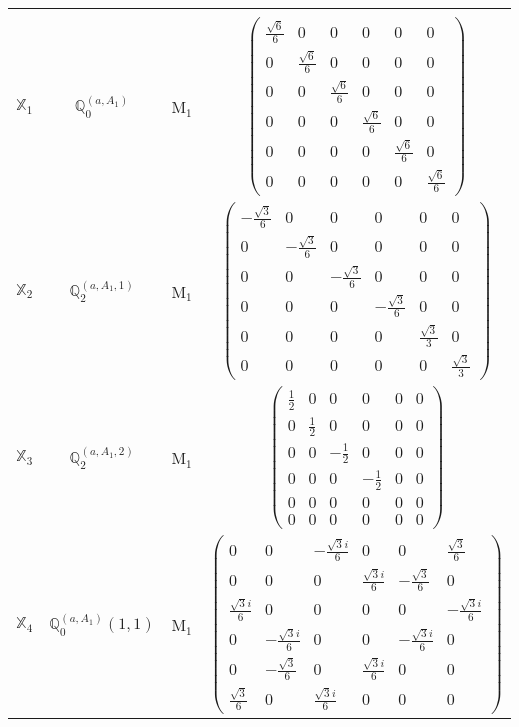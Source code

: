 \documentclass[fleqn,10pt,landscape]{article}
\begin{document}
\begin{itemize}
\begin{center}
\begin{longtable}{c|c|c|c}
 \hline \hline
\multicolumn{3}{r}{} \\ \endlastfoot

$ \mathbb{X}_{1} $ & $\mathbb{Q}_{0}^{(a,A_{1})}$ & M$_{1}$ & $\begin{pmatrix} \frac{\sqrt{6}}{6} & 0 & 0 & 0 & 0 & 0 \\ 0 & \frac{\sqrt{6}}{6} & 0 & 0 & 0 & 0 \\ 0 & 0 & \frac{\sqrt{6}}{6} & 0 & 0 & 0 \\ 0 & 0 & 0 & \frac{\sqrt{6}}{6} & 0 & 0 \\ 0 & 0 & 0 & 0 & \frac{\sqrt{6}}{6} & 0 \\ 0 & 0 & 0 & 0 & 0 & \frac{\sqrt{6}}{6} \end{pmatrix}$ \\
$ \mathbb{X}_{2} $ & $\mathbb{Q}_{2}^{(a,A_{1},1)}$ & M$_{1}$ & $\begin{pmatrix} - \frac{\sqrt{3}}{6} & 0 & 0 & 0 & 0 & 0 \\ 0 & - \frac{\sqrt{3}}{6} & 0 & 0 & 0 & 0 \\ 0 & 0 & - \frac{\sqrt{3}}{6} & 0 & 0 & 0 \\ 0 & 0 & 0 & - \frac{\sqrt{3}}{6} & 0 & 0 \\ 0 & 0 & 0 & 0 & \frac{\sqrt{3}}{3} & 0 \\ 0 & 0 & 0 & 0 & 0 & \frac{\sqrt{3}}{3} \end{pmatrix}$ \\
$ \mathbb{X}_{3} $ & $\mathbb{Q}_{2}^{(a,A_{1},2)}$ & M$_{1}$ & $\begin{pmatrix} \frac{1}{2} & 0 & 0 & 0 & 0 & 0 \\ 0 & \frac{1}{2} & 0 & 0 & 0 & 0 \\ 0 & 0 & - \frac{1}{2} & 0 & 0 & 0 \\ 0 & 0 & 0 & - \frac{1}{2} & 0 & 0 \\ 0 & 0 & 0 & 0 & 0 & 0 \\ 0 & 0 & 0 & 0 & 0 & 0 \end{pmatrix}$ \\
$ \mathbb{X}_{4} $ & $\mathbb{Q}_{0}^{(a,A_{1})}(1,1)$ & M$_{1}$ & $\begin{pmatrix} 0 & 0 & - \frac{\sqrt{3} i}{6} & 0 & 0 & \frac{\sqrt{3}}{6} \\ 0 & 0 & 0 & \frac{\sqrt{3} i}{6} & - \frac{\sqrt{3}}{6} & 0 \\ \frac{\sqrt{3} i}{6} & 0 & 0 & 0 & 0 & - \frac{\sqrt{3} i}{6} \\ 0 & - \frac{\sqrt{3} i}{6} & 0 & 0 & - \frac{\sqrt{3} i}{6} & 0 \\ 0 & - \frac{\sqrt{3}}{6} & 0 & \frac{\sqrt{3} i}{6} & 0 & 0 \\ \frac{\sqrt{3}}{6} & 0 & \frac{\sqrt{3} i}{6} & 0 & 0 & 0 \end{pmatrix}$ \\

\end{longtable}
\end{center}
\end{itemize}
\end{document}
